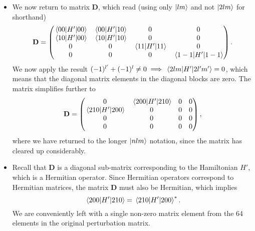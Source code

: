 \documentclass[11pt, a4paper]{article}
\newcommand{\mat}[1]{\mathbf{#1}} %
\begin{document}
\begin{itemize}
	
	\item We now return to matrix $ \mat{D} $, which read (using only $ \ket{lm} $ and not $ \ket{2lm} $ for shorthand)
	\begin{equation*}
		\mat{D} =
		\begin{pmatrix}
			\mel{00}{H'}{00} & \mel{00}{H'}{10} & 0 & 0\\
			\mel{10}{H'}{00} & \mel{10}{H'}{10} & 0 & 0\\
			0 & 0 & \mel{11}{H'}{11} & 0 \\
			0 & 0 & 0 & \mel{1-1}{H'}{1-1}
		\end{pmatrix}.
	\end{equation*}
	We now apply the result $ (-1)^{l'} + (-1)^{l} \neq 0 \implies \mel{2lm}{H'}{2l'm'} = 0 $, which means that the diagonal matrix elements in the diagonal blocks are zero. The matrix simplifies further to
	\begin{equation*}
		\mat{D} =
		\begin{pmatrix}
			0 & \mel{200}{H'}{210} & 0 & 0\\
			\mel{210}{H'}{200} & 0 & 0 & 0\\
			0 & 0 & 0 & 0 \\
			0 & 0 & 0 & 0
		\end{pmatrix},
	\end{equation*}
	where we have returned to the longer $ \ket{nlm} $ notation, since the matrix has cleared up considerably. 
	
	\item Recall that $ \mat{D} $ is a diagonal sub-matrix corresponding to the Hamiltonian $ H' $, which is a Hermitian operator. Since Hermitian operators correspond to Hermitian matrices, the matrix $ \mat{D} $ must also be Hermitian, which implies
	\begin{equation*}
		\mel{200}{H'}{210} = \mel{210}{H'}{200}^{*}.
	\end{equation*}
	We are conveniently left with a single non-zero matrix element from the 64 elements in the original perturbation matrix.
	

\end{itemize}
\end{document}
